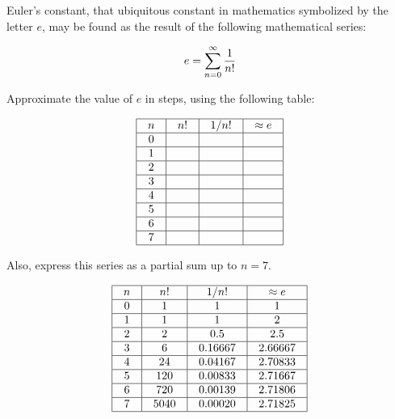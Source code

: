 

Euler's constant, that ubiquitous constant in mathematics symbolized by the letter $e$, may be found as the result of the following mathematical series:

$$e = \sum_{n=0}^{\infty} {1 \over {n!}}$$

Approximate the value of $e$ in steps, using the following table:


$$\vbox{\offinterlineskip
\halign{\strut
\vrule \quad\hfil # \ \hfil & 
\vrule \quad\hfil # \ \hfil & 
\vrule \quad\hfil # \ \hfil & 
\vrule \quad\hfil # \ \hfil \vrule \cr
\noalign{\hrule}
%
$n$ & $n!$ & $1 / n!$ & $\approx e$ \cr
%
\noalign{\hrule}
%
0 &  &  &  \cr
%
\noalign{\hrule}
%
1 &  &  &  \cr
%
\noalign{\hrule}
%
2 &  &  &  \cr
%
\noalign{\hrule}
%
3 &  &  &  \cr
%
\noalign{\hrule}
%
4 &  &  &  \cr
%
\noalign{\hrule}
%
5 &  &  &  \cr
%
\noalign{\hrule}
%
6 &  &  &  \cr
%
\noalign{\hrule}
%
7 &  &  &  \cr
%
\noalign{\hrule}
} %
}$$ %

Also, express this series as a partial sum up to $n = 7$.








$$\vbox{\offinterlineskip
\halign{\strut
\vrule \quad\hfil # \ \hfil & 
\vrule \quad\hfil # \ \hfil & 
\vrule \quad\hfil # \ \hfil & 
\vrule \quad\hfil # \ \hfil \vrule \cr
\noalign{\hrule}
%
$n$ & $n!$ & $1 / n!$ & $\approx e$ \cr
%
\noalign{\hrule}
%
0 & 1 & 1 & 1 \cr
%
\noalign{\hrule}
%
1 & 1 & 1 & 2 \cr
%
\noalign{\hrule}
%
2 & 2 & 0.5 & 2.5 \cr
%
\noalign{\hrule}
%
3 & 6 & 0.16667 & 2.66667 \cr
%
\noalign{\hrule}
%
4 & 24 & 0.04167 & 2.70833 \cr
%
\noalign{\hrule}
%
5 & 120 & 0.00833 & 2.71667 \cr
%
\noalign{\hrule}
%
6 & 720 & 0.00139 & 2.71806 \cr
%
\noalign{\hrule}
%
7 & 5040 & 0.00020 & 2.71825 \cr
%
\noalign{\hrule}
} %
}$$ %

